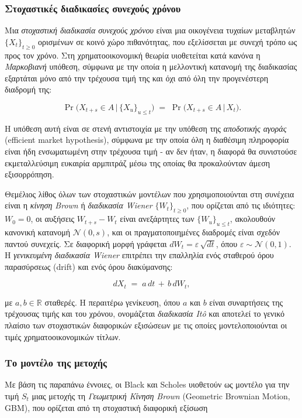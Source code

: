 \documentclass[12pt]{article}
\begin{document}
\subsubsection{Στοχαστικές διαδικασίες συνεχούς χρόνου}

Μια \emph{στοχαστική διαδικασία συνεχούς χρόνου} είναι μια οικογένεια τυχαίων μεταβλητών $\{X_t\}_{t \geq 0}$ ορισμένων σε κοινό χώρο πιθανότητας, που εξελίσσεται με συνεχή τρόπο ως προς τον χρόνο. Στη χρηματοοικονομική θεωρία υιοθετείται κατά κανόνα η \emph{Μαρκοβιανή} υπόθεση, σύμφωνα με την οποία η μελλοντική κατανομή της διαδικασίας εξαρτάται μόνο από την τρέχουσα τιμή της και όχι από όλη την προγενέστερη διαδρομή της:

$$
\Pr\bigl(X_{t+s} \in A \,\big|\, \{X_u\}_{u \leq t}\bigr) \;=\; \Pr\bigl(X_{t+s} \in A \,\big|\, X_t\bigr).
$$

Η υπόθεση αυτή είναι σε στενή αντιστοιχία με την υπόθεση της \emph{αποδοτικής αγοράς} (efficient market hypothesis), σύμφωνα με την οποία όλη η διαθέσιμη πληροφορία είναι ήδη ενσωματωμένη στην τρέχουσα τιμή - αν δεν ήταν, η διαφορά θα συνιστούσε εκμεταλλεύσιμη ευκαιρία αρμπιτράζ μέσω της οποίας θα προκαλούνταν άμεση εξισορρόπηση.

Θεμέλιος λίθος όλων των στοχαστικών μοντέλων που χρησιμοποιούνται στη συνέχεια είναι η \emph{κίνηση Brown} ή \emph{διαδικασία Wiener} $\{W_t\}_{t \geq 0}$, που ορίζεται από τις ιδιότητες: $W_0 = 0$, οι αυξήσεις $W_{t+s} - W_t$ είναι ανεξάρτητες των $\{W_u\}_{u \leq t}$, ακολουθούν κανονική κατανομή $\mathcal{N}(0, s)$, και οι πραγματοποιημένες διαδρομές είναι σχεδόν παντού συνεχείς. Σε διαφορική μορφή γράφεται $dW_t = \varepsilon\,\sqrt{dt}$, όπου $\varepsilon \sim \mathcal{N}(0, 1)$. Η \emph{γενικευμένη διαδικασία Wiener} επιτρέπει την επαλληλία ενός σταθερού όρου παρασύρσεως (drift) και ενός όρου διακύμανσης:

$$
dX_t \;=\; a\,dt \,+\, b\,dW_t,
$$

με $a, b \in \mathbb{R}$ σταθερές. Η περαιτέρω γενίκευση, όπου $a$ και $b$ είναι συναρτήσεις της τρέχουσας τιμής και του χρόνου, ονομάζεται \emph{διαδικασία Itô} και αποτελεί το γενικό πλαίσιο των στοχαστικών διαφορικών εξισώσεων με τις οποίες μοντελοποιούνται οι τιμές χρηματοοικονομικών τίτλων.

\subsubsection{Το μοντέλο της μετοχής}

Με βάση τις παραπάνω έννοιες, οι Black και Scholes υιοθετούν ως μοντέλο για την τιμή $S_t$ μιας μετοχής τη \emph{Γεωμετρική Κίνηση Brown} (Geometric Brownian Motion, GBM), που ορίζεται από τη στοχαστική διαφορική εξίσωση
\end{document}
